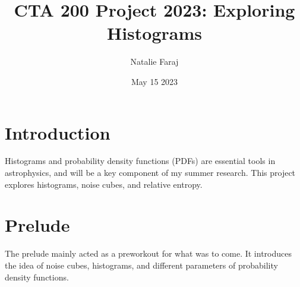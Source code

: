 \documentclass{article}
\title{CTA 200 Project 2023:
Exploring Histograms}
\author{Natalie Faraj }
\date{May 15 2023}
\begin{document}
\maketitle

\section{Introduction}
Histograms and probability density functions (PDFs) are essential tools in astrophysics, and will be a key component of my summer research. This project explores histograms, noise cubes, and relative entropy. 

\section{Prelude}
The prelude mainly acted as a preworkout for what was to come. It introduces the idea of noise cubes, histograms, and different parameters of probability density functions.
\end{document}
